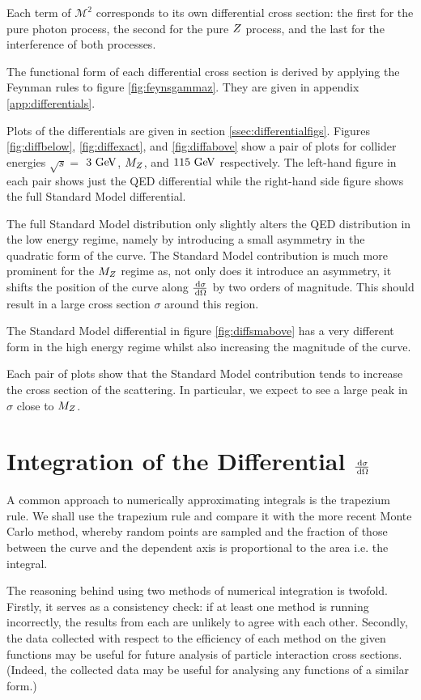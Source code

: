 \documentclass[]{article}
\begin{document}
Each term of $\mathcal{M}^{2}$ corresponds to its own differential cross section: the first for the pure photon process, the second for the pure $Z $ process, and the last for the interference of both processes.

The functional form of each differential cross section is derived by applying the Feynman rules to figure \ref{fig:feynsgammaz}. They are given in appendix \ref{app:differentials}.

Plots of the differentials are given in section \ref{ssec:differentialfigs}. Figures \ref{fig:diffbelow}, \ref{fig:diffexact}, and \ref{fig:diffabove} show a pair of plots for collider energies $\sqrt{s}=$ $3\GeV$, $M_{Z }$, and $115\GeV$ respectively. The left-hand figure in each pair shows just the QED differential while the right-hand side figure shows the full Standard Model differential.

The full Standard Model distribution only slightly alters the QED distribution in the low energy regime, namely by introducing a small asymmetry in the quadratic form of the curve. The Standard Model contribution is much more prominent for the $M_{Z }$ regime as, not only does it introduce an asymmetry, it shifts the position of the curve along $\frac{\,\operatorname{d}\!{\sigma}}{\,\operatorname{d}\!{\Omega}}$ by two orders of magnitude. This should result in a large cross section $\sigma$ around this region.

The Standard Model differential in figure \ref{fig:diffsmabove} has a very different form in the high energy regime whilst also increasing the magnitude of the curve.

Each pair of plots show that the Standard Model contribution tends to increase the cross section of the scattering. In particular, we expect to see a large peak in $\sigma$ close to $M_{Z }$.

\section{Integration of the Differential $\frac{\,\operatorname{d}\!{\sigma}}{\,\operatorname{d}\!{\Omega}}$}\label{sec:integration}

A common approach to numerically approximating integrals is the trapezium rule. We shall use the trapezium rule and compare it with the more recent Monte Carlo method, whereby random points are sampled and the fraction of those between the curve and the dependent axis is proportional to the area i.e. the integral.

The reasoning behind using two methods of numerical integration is twofold. Firstly, it serves as a consistency check: if at least one method is running incorrectly, the results from each are unlikely to agree with each other. Secondly, the data collected with respect to the efficiency of each method on the given functions may be useful for future analysis of particle interaction cross sections. (Indeed, the collected data may be useful for analysing any functions of a similar form.)
\end{document}

